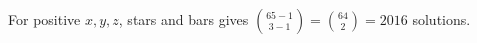 For positive $x,y,z$, stars and bars gives $\binom{65-1}{3-1}=\binom{64}{2}=\boxed{2016}$ solutions.
